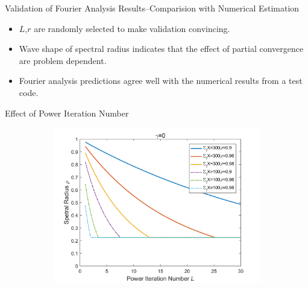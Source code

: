 \begin{frame}{Validation of Fourier Analysis Results--Comparision with Numerical Estimation}
\vspace{-1.5em}
\begin{itemize}
    \item $L$,$r$ are randomly selected to make validation convincing. 
    \vspace{-0.5em}
    \item Wave shape of spectral radius indicates that the effect of partial convergence are problem dependent.
    \vspace{-0.5em}
    \item Fourier analysis predictions agree well with the numerical results from a test code.
\end{itemize}   
\end{frame}


\begin{frame}{Effect of Power Iteration Number}
\vspace{-1em}
 \begin{figure}
	\centering
	\captionsetup[subfigure]{justification=centering}
	\begin{subfigure}[t]{0.4\textwidth}
		\centering
 		\includegraphics[width=\textwidth]{Texfile/Figure/noFeedback.png}
	\end{subfigure}
	\begin{subfigure}[t]{0.4\textwidth}
		\centering

\end{subfigure}
\end{figure}
\end{frame}
